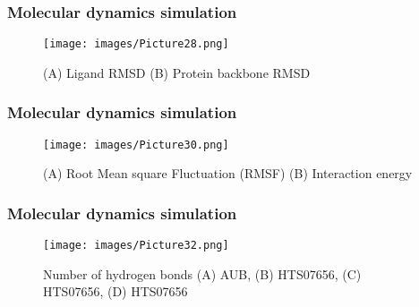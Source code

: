 \documentclass{beamer}
\begin{document}
\begin{frame}
\frametitle{\textbf{Molecular dynamics simulation}}
\begin{figure}
\texttt{[image: images/Picture28.png]}
\caption{(A) Ligand RMSD (B) Protein backbone RMSD}
\end{figure}
\end{frame}

\begin{frame}
\frametitle{\textbf{Molecular dynamics simulation}}
\begin{figure}
\texttt{[image: images/Picture30.png]}
\caption{(A) Root Mean square Fluctuation (RMSF) (B) Interaction energy}
\end{figure}
\end{frame}

\begin{frame}
\frametitle{\textbf{Molecular dynamics simulation}}
\begin{figure}
\texttt{[image: images/Picture32.png]}
\caption{Number of hydrogen bonds (A) AUB, (B) HTS07656, (C) HTS07656, (D) HTS07656}
\end{figure}
\end{frame}
\end{document}
